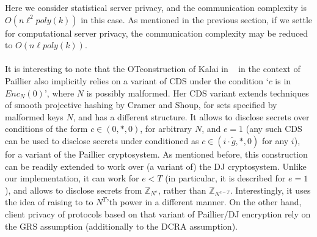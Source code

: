 \documentclass{article}
\newcommand{\Z}{{\mathbb{Z}}}
\newcommand{\ot}{\mbox{OT}\;}
\begin{document}
Here we consider statistical server privacy, and the communication complexity
is $O(n\ell^2poly(k))$ in this case. As mentioned in the previous section, if we settle for computational server privacy, the communication complexity may be reduced to $O(n\ell poly(k))$.

\paragraph{} It is interesting to note that the \ot construction of Kalai in ~\cite{T05} in the context
of Paillier also implicitly relies on a variant of CDS under the condition `$c$ is in $Enc_N(0)$', where $N$ is possibly malformed.
Her CDS variant extends techniques of smooth projective hashing by Cramer and Shoup,
for sets specified by malformed keys $N$, and has a different structure.
It allows to disclose secrets over conditions of the form $c\in(0,*,0)$, for arbitrary $N$, and $e=1$
(any such CDS can be used to disclose secrets under conditioned as $c\in(i\cdot \tilde{g},*,0)$ for any $i$), for a variant of the Paillier cryptosystem. As mentioned before, this construction can be
readily extended to work over (a variant of) the DJ cryptosystem. Unlike our implementation, it can work
for $e<T$ (in particular, it is described for $e=1$), and allows to disclose secrets from $\Z_{N^e}$,
rather than $\Z_{N^{e-T}}$. Interestingly, it uses the idea of raising to to $N^T$'th power in a different manner. On the other hand, client privacy of protocols based on that variant of Paillier/DJ encryption
rely on the GRS assumption (additionally to the DCRA assumption).
  
\end{document}
